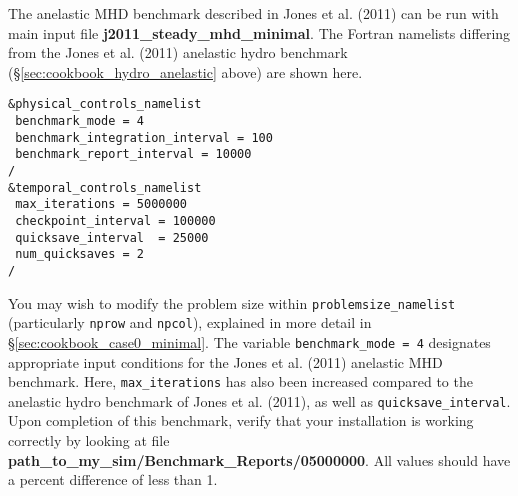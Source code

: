 The anelastic MHD benchmark described in Jones et al. (2011) can be run with main input file \textbf{j2011\_steady\_mhd\_minimal}. The Fortran namelists differing from the Jones et al. (2011) anelastic hydro benchmark (\S \ref{sec:cookbook_hydro_anelastic} above) are shown here.      
    
\begin{lstlisting}
&physical_controls_namelist
 benchmark_mode = 4
 benchmark_integration_interval = 100
 benchmark_report_interval = 10000
/
&temporal_controls_namelist
 max_iterations = 5000000
 checkpoint_interval = 100000
 quicksave_interval  = 25000
 num_quicksaves = 2
/
\end{lstlisting} 

You may wish to modify the problem size within \texttt{problemsize\_namelist} (particularly \texttt{nprow} and \texttt{npcol}), explained in more detail in \S \ref{sec:cookbook_case0_minimal}. The variable \texttt{benchmark\_mode = 4} designates appropriate input conditions for the Jones et al. (2011) anelastic MHD benchmark. Here, \texttt{max\_iterations} has also been increased compared to the anelastic hydro benchmark of Jones et al. (2011), as well as \texttt{quicksave\_interval}. Upon completion of this benchmark, verify that your installation is working correctly by looking at file \textbf{path\_to\_my\_sim/Benchmark\_Reports/05000000}. All values should have a percent difference of less than 1.    
  



 
    
    
    
    
